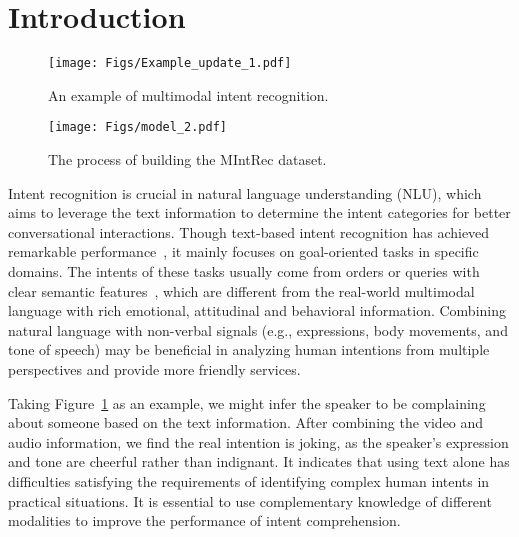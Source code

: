 \documentclass[sigconf,camera-ready]{acmart}
\begin{document}
\maketitle

\section{Introduction}
\begin{figure}[t!]\small
	\centering  
	\texttt{[image: Figs/Example\_update\_1.pdf]}

\caption{\label{example} An example of multimodal intent recognition.}
\end{figure}
\begin{figure*}[t!]\small
	\centering  
	\texttt{[image: Figs/model\_2.pdf]}
	\caption{\label{pipeline} The process of building the  MIntRec dataset.
}
\end{figure*}
Intent recognition is crucial in natural language understanding (NLU), which aims to leverage the text information to determine the intent categories for better conversational interactions. Though text-based intent recognition has achieved remarkable performance~\cite{chen2019bert, qin-etal-2019-stack,zhang-etal-2021-textoir}, it mainly focuses on goal-oriented tasks in specific domains. The intents of these tasks usually come from orders or queries with clear semantic features~\cite{coucke2018snips,casanueva2020efficient}, which are different from the real-world multimodal language with rich emotional, attitudinal and behavioral information. Combining natural language with non-verbal signals (e.g., expressions, body movements, and tone of speech) may be beneficial in analyzing human intentions 
from multiple perspectives and provide more friendly services. 














Taking Figure~\ref{example} as an example, we might infer the speaker to be complaining about someone based on the text information. After combining the video and audio information, we find the real intention is joking, as the speaker's expression and tone are cheerful rather than indignant. It 
indicates that using text alone has difficulties satisfying the requirements of identifying complex human intents in practical situations. It is essential to use complementary knowledge of different modalities to improve the performance of intent comprehension.
\end{document}
